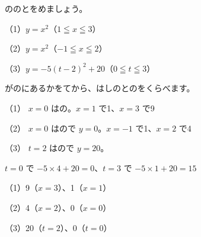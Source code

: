 \begin{reidai}
ののとをめましょう。\par
（1）\nobreak $y=x^2$（$1\leqq x\leqq3$）\par（2）\nobreak $y=x^2$（$-1\leqq x\leqq2$）\par（3）\nobreak $y=-5(t-2)^2+20$（$0\leqq t\leqq3$）\par
\kangaekata {}がのにあるかをてから、はしのとのをくらべます。\par
\shiki（1）\nobreak {} $x=0$ はの。$x=1$ で1、$x=3$ で9\par
\hspace*{2.6\zw}（2）\nobreak {} $x=0$ はので $y=0$。$x=-1$ で1、$x=2$ で4\par
\hspace*{2.6\zw}（3）\nobreak {} $t=2$ はので $y=20$。\par
\hspace*{4.3\zw}$t=0$ で $-5\times4+20=0$、$t=3$ で $-5\times1+20=15$\par
\kotae（1）\nobreak {}9（$x=3$）、1（$x=1$）\par
\hspace*{2.6\zw}（2）\nobreak {}4（$x=2$）、0（$x=0$）\par
\hspace*{2.6\zw}（3）\nobreak {}20（$t=2$）、0（$t=0$）
\end{reidai}

